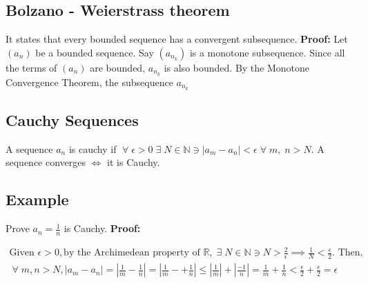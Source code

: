 \documentclass[12pt, a4paper]{article}
\newcommand{\ex}{\; \exists \;}
\newcommand{\real}{\mathbb{R}}
\newcommand{\nat}{\mathbb{N}}
\newcommand{\all}{\; \forall \;}
\begin{document}
\subsection{Bolzano - Weierstrass theorem}
It states that every bounded sequence has a convergent subsequence.
\textbf{Proof: } Let $(a_n)$ be a bounded sequence. Say $(a_{n_k})$ is a
monotone subsequence. Since all the terms of $(a_n)$ are bounded, 
$a_{n_k}$ is also bounded. By the Monotone Convergence Theorem, the
subsequence $a_{n_k}$

\subsection{Cauchy Sequences}
A sequence $ a_n $ is cauchy if $ \all \epsilon > 0 \ex N \in \nat
\ni |a_m - a_n| < \epsilon \all m, \; n > N$. A sequence converges $ \iff $
it is Cauchy.

\subsection{Example}
Prove $a_n = \frac{1}{n}$ is Cauchy. \textbf{Proof: } 

\begin{gather*}
  \text{Given } \epsilon > 0, \text{by the Archimedean property of } 
  \real, \ex N \in \nat \ni N > \frac{2}{\epsilon} \implies \frac{1}{N}
  < \frac{\epsilon}{2}. \text{ Then, } \\ \all m, n > N, 
  |a_m - a_n| = |\frac{1}{m} - \frac{1}{n}| = |\frac{1}{m} -  + \frac{1}{n}| 
  \leq |\frac{1}{m}| + |\frac{-1}{n}| = \frac{1}{m} + \frac{1}{n} < 
 \frac{\epsilon}{2} + \frac{\epsilon}{2} = \epsilon
\end{gather*}
\end{document}

